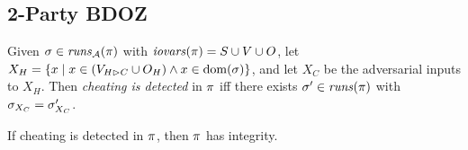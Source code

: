 \subsection{2-Party BDOZ}



\begin{definition}
  Given $\sigma \in \mathit{runs}_{\mathcal{A}}(\pi)$ with $\mathit{iovars}(\pi) = S \cup V \cup O$,
  let $X_H = \{ x \mid x \in (V_{H \rhd C} \cup O_H) \wedge x \in \mathrm{dom}(\sigma) \}$,
  and let $X_C$ be the adversarial inputs to $X_H$.
  Then \emph{cheating is detected} in $\pi$ iff there exists $\sigma'\in \mathit{runs}(\pi)$
  with $\sigma_{X_C} = \sigma'_{X_C}$.  
\end{definition}

\begin{lemma}
  If cheating is detected in $\pi$, then $\pi$ has integrity.
\end{lemma}
